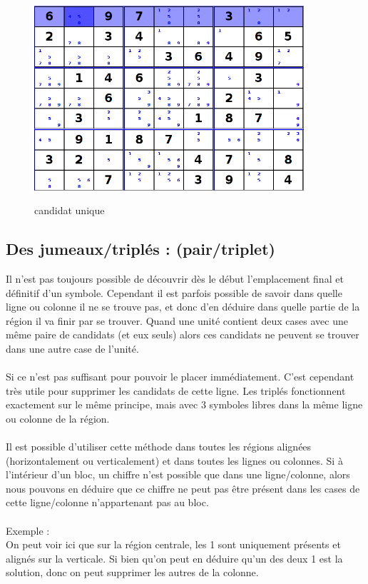 \begin{figure}[ht]
  \caption{\label{annexe2} candidat unique}
  \includegraphics [width=100mm]{images/one-candidate.png} \\[0.5cm]
\end{figure}


\subsection{Des jumeaux/triplés : (pair/triplet)}
Il n'est pas toujours possible de découvrir dès le début l'emplacement final et définitif d'un symbole. 
Cependant il est parfois possible de savoir dans quelle ligne ou colonne il ne se trouve pas, et donc 
d'en déduire dans quelle partie de la région il va finir par se trouver.
Quand une unité contient deux cases avec une même paire de candidats (et eux seuls) alors ces candidats 
ne peuvent se trouver dans une autre case de l'unité. \\
\\
Si ce n'est pas suffisant pour pouvoir le placer immédiatement. C'est cependant très utile pour 
supprimer les candidats de cette ligne.
Les triplés fonctionnent exactement sur le même principe, mais avec 3 symboles libres dans la même 
ligne ou colonne de la région.\\
\\
Il est possible d'utiliser cette méthode dans toutes les régions alignées (horizontalement ou verticalement) 
et dans toutes les lignes ou colonnes.
Si à l’intérieur d’un bloc, un chiffre n’est possible que dans une ligne/colonne, alors
nous pouvons en déduire que ce chiffre ne peut pas être présent dans les cases de cette
ligne/colonne n’appartenant pas au bloc.\\
\\
Exemple :\\
On peut voir ici que sur la région centrale, les 1 sont uniquement présents 
et alignés sur la verticale.
Si bien qu'on peut en déduire qu'un des deux 1 est la solution, 
donc on peut supprimer les autres de la colonne.\\


